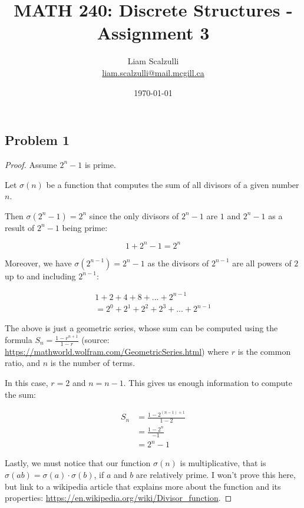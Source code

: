 \documentclass[10pt]{article}
\title{MATH 240: Discrete Structures - Assignment 3}
\author{Liam Scalzulli\\
\href{mailto:liam.scalzulli@mail.mcgill.ca}{liam.scalzulli@mail.mcgill.ca}}
\date{\today}
\begin{document}
\maketitle

\subsection*{Problem 1}

\begin{proof}
  Assume $2^n - 1$ is prime. \spacing

  \noindent
  Let $\sigma(n)$ be a function that computes the sum of all divisors of a given
  number $n$.
  \spacing

  \noindent
  Then $\sigma(2^n - 1) = 2^n$ since the only divisors of $2^n - 1$ are $1$ and $2 ^ n - 1$ as a result
  of $2^n - 1$ being prime:

  $$ 1 + 2^{n} - 1 = 2^{n} $$

  \noindent
  Moreover, we have $\sigma(2^{n - 1}) = 2^n - 1$ as the divisors of $2^{n - 1}$ are all powers of $2$ up to
  and including $2^{n - 1}$:

  \begin{align*}
    1 + 2 + 4 + 8 + ... + 2^{n - 1} \\
    = 2^0 + 2^1 + 2^2 + 2^3 + ... + 2^{n - 1}
  \end{align*}

  \noindent
  The above is just a geometric series, whose sum can be computed using the formula 
  $S_{n} = \frac{1 - r^{n + 1}}{1 - r}$ (source: \href{https://mathworld.wolfram.com/GeometricSeries.html}{https://mathworld.wolfram.com/GeometricSeries.html}) 
  where $r$ is the common ratio, and $n$ is the number of terms.
  \spacing

  \noindent
  In this case, $r = 2$ and $n = n - 1$. This gives us enough information to compute the sum:

  \begin{align*}
    S_{n} &= \frac{1 - 2^{(n - 1) + 1}}{1 - 2} \\
      &= \frac{1 - 2^n}{-1} \\
      &= 2^n - 1
  \end{align*}

  \spacing

  \noindent
  Lastly, we must notice that our function $\sigma(n)$ is multiplicative, that is $\sigma(ab) = \sigma(a) \cdot \sigma(b)$, 
  if $a$ and $b$ are relatively prime. I won't prove this here, but link to a wikipedia article that explains more
  about the function and its properties: \href{https://en.wikipedia.org/wiki/Divisor_function}{https://en.wikipedia.org/wiki/Divisor\_function}.
  \spacing


\end{proof}
\end{document}
